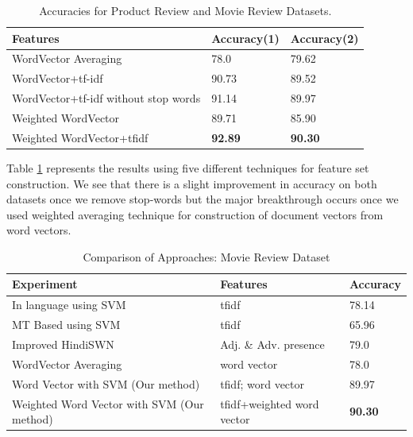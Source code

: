 \documentclass[11pt,a4paper]{article}
\begin{document}
\begin {table}[h!]
\centering
\small
\begin{tabular}{ | p{3.6cm} | p{1.5cm} | p{1.5cm} | }
\hline
\textbf{Features} & \textbf{Accuracy(1)} & \textbf{Accuracy(2)} \\ \hline
WordVector Averaging & 78.0 & 79.62\\ \hline
WordVector+tf-idf & 90.73 & 89.52\\ \hline
WordVector+tf-idf without stop words & 91.14 & 89.97\\ \hline
Weighted WordVector & 89.71 & 85.90\\ \hline
Weighted WordVector+tfidf & \textbf{92.89} & \textbf{90.30}\\ \hline
\end{tabular}
\caption {Accuracies for Product Review and Movie Review Datasets.}
\label{table:hindi_ourmethods}
\end{table}

Table \ref{table:hindi_ourmethods} represents the results using five different techniques for feature set construction. We see that there is a slight improvement in accuracy on both datasets once we remove stop-words but the major breakthrough occurs once we used weighted averaging technique for construction of document vectors from word vectors.

\begin {table}[H]
\centering
\small
\begin{tabular}{ | p{3.5cm} | p{1.7cm} | p{1.3cm} | }
\hline
\textbf{Experiment} & \textbf{Features} & \textbf{Accuracy} \\ \hline
In language using SVM~\cite{Joshi:10} & tfidf & 78.14\\ \hline
MT Based using SVM~\cite{Joshi:10} & tfidf & 65.96\\ \hline
Improved HindiSWN \cite{Bakliwal:12} & Adj. \& Adv. presence & 79.0\\ \hline
WordVector Averaging & word vector & 78.0\\ \hline
Word Vector with SVM (Our method) & tfidf; word vector & 89.97\\ \hline
Weighted Word Vector with SVM (Our method) & tfidf+weighted word vector & \textbf{90.30}\\ \hline
\end{tabular}
\caption {Comparison of Approaches: Movie Review Dataset}
\label{table:hindi_movie}
\end{table}
\end{document}
